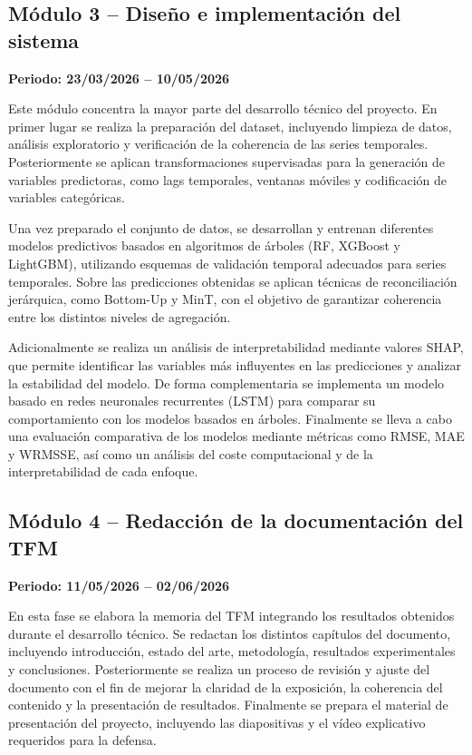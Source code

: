 \documentclass[IB,BIB]{TFUOC}%
\begin{document}
\subsection{Módulo 3 -- Diseño e implementación del sistema}

\textbf{Periodo: 23/03/2026 -- 10/05/2026}

Este módulo concentra la mayor parte del desarrollo técnico del
proyecto. En primer lugar se realiza la preparación del dataset,
incluyendo limpieza de datos, análisis exploratorio y verificación de la
coherencia de las series temporales. Posteriormente se aplican
transformaciones supervisadas para la generación de variables
predictoras, como lags temporales, ventanas móviles y codificación de
variables categóricas.

Una vez preparado el conjunto de datos, se desarrollan y entrenan
diferentes modelos predictivos basados en algoritmos de árboles
(RF, XGBoost y LightGBM), utilizando esquemas de validación temporal
adecuados para series temporales. Sobre las predicciones obtenidas se
aplican técnicas de reconciliación jerárquica, como Bottom-Up y MinT,
con el objetivo de garantizar coherencia entre los distintos niveles de
agregación.

Adicionalmente se realiza un análisis de interpretabilidad mediante
valores SHAP, que permite identificar las variables más influyentes en
las predicciones y analizar la estabilidad del modelo. De forma
complementaria se implementa un modelo basado en redes neuronales
recurrentes (LSTM) para comparar su comportamiento con los modelos
basados en árboles. Finalmente se lleva a cabo una evaluación
comparativa de los modelos mediante métricas como RMSE, MAE y WRMSSE,
así como un análisis del coste computacional y de la interpretabilidad
de cada enfoque.

\newpage
\subsection{Módulo 4 -- Redacción de la documentación del TFM}

\textbf{Periodo: 11/05/2026 -- 02/06/2026}

En esta fase se elabora la memoria del TFM integrando los resultados
obtenidos durante el desarrollo técnico. Se redactan los distintos
capítulos del documento, incluyendo introducción, estado del arte,
metodología, resultados experimentales y conclusiones. Posteriormente se
realiza un proceso de revisión y ajuste del documento con el fin de
mejorar la claridad de la exposición, la coherencia del contenido y la
presentación de resultados. Finalmente se prepara el material de
presentación del proyecto, incluyendo las diapositivas y el vídeo
explicativo requeridos para la defensa.
\end{document}
